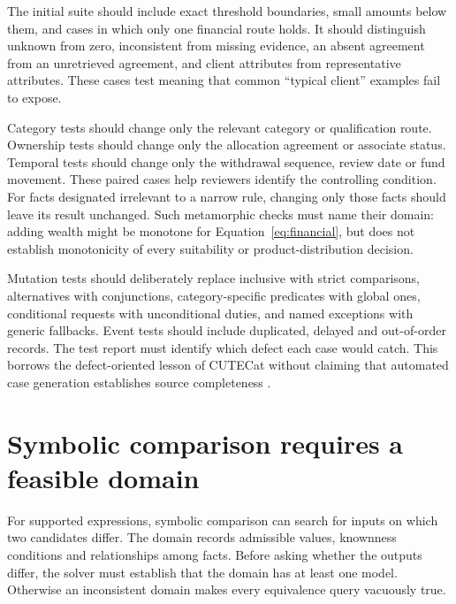 The initial suite should include exact threshold boundaries, small amounts below
them, and cases in which only one financial route holds. It should distinguish
unknown from zero, inconsistent from missing evidence, an absent agreement from
an unretrieved agreement, and client attributes from representative attributes.
These cases test meaning that common ``typical client'' examples fail to expose.

Category tests should change only the relevant category or qualification route.
Ownership tests should change only the allocation agreement or associate status.
Temporal tests should change only the withdrawal sequence, review date or fund
movement. These paired cases help reviewers identify the controlling condition.
For facts designated irrelevant to a narrow rule, changing only those facts should
leave its result unchanged. Such metamorphic checks must name their domain:
adding wealth might be monotone for Equation~\eqref{eq:financial}, but does not
establish monotonicity of every suitability or product-distribution decision.


Mutation tests should deliberately replace inclusive with strict comparisons,
alternatives with conjunctions, category-specific predicates with global ones,
conditional requests with unconditional duties, and named exceptions with generic
fallbacks. Event tests should include duplicated, delayed and out-of-order records.
The test report must identify which defect each case would catch. This borrows
the defect-oriented lesson of CUTECat without claiming that automated case
generation establishes source completeness \citep{cutecat2025}.

\section{Symbolic comparison requires a feasible domain}
\label{merge:M07:07}


For supported expressions, symbolic comparison can search for inputs on which two
candidates differ. The domain records admissible values, knownness conditions and
relationships among facts. Before asking whether the outputs differ, the solver
must establish that the domain has at least one model. Otherwise an inconsistent
domain makes every equivalence query vacuously true.

